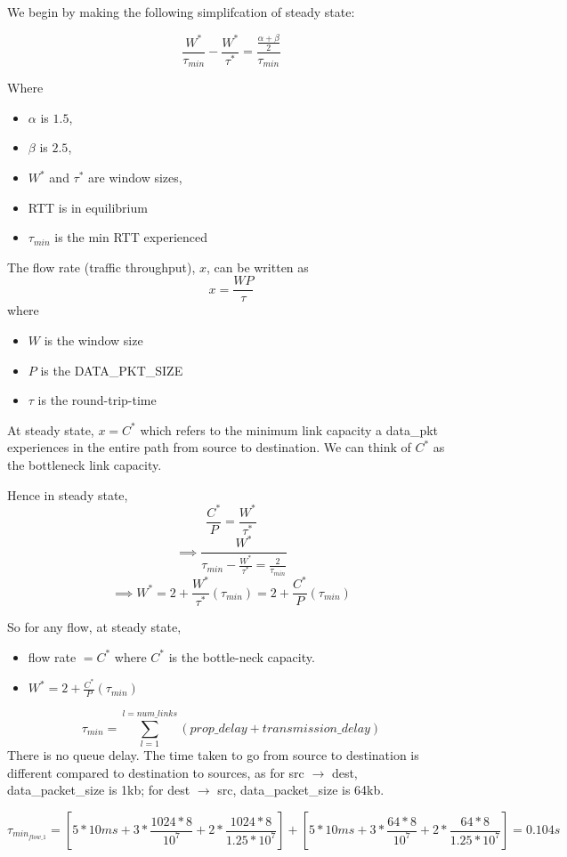 \documentclass[12pt]{article}
\begin{document}
We begin by making the following simplifcation of steady state:

$$ \frac{W^*}{\tau_{min}} - \frac{W^*}{\tau^*} = \frac{\frac{\alpha + \beta}{2}}{\tau_{min}} $$

Where 
\begin{itemize}
\item $\alpha$ is $1.5$,
\item $\beta$ is $2.5$,
\item $W^*$ and $\tau^*$ are window sizes,
\item RTT is in equilibrium
\item $\tau_{min}$ is the min RTT experienced
\end{itemize}

The flow rate (traffic throughput), $x$, can be written as $$x=\frac{WP}{\tau}$$ where
\begin{itemize}
\item $W$ is the window size
\item $P$ is the DATA\_PKT\_SIZE
\item $\tau$ is the round-trip-time
\end{itemize}

At steady state, $x=C^*$ which refers to the minimum link capacity a data\_pkt experiences in the entire path from source to destination. We can think of $C^*$ as the bottleneck link capacity.

Hence in steady state, $$\frac{C^*}{P} = \frac{W^*}{\tau^*} $$
$$\implies \frac{W^*}{\tau_{min} - \frac{W^*}{\tau^*} = \frac{2}{\tau_{min}}}$$
$$\implies W^* = 2 + \frac{W^*}{\tau^*}(\tau_{min}) = 2 + \frac{C^*}{P}(\tau_{min}) $$

So for any flow, at steady state, 
\begin{itemize}
\item flow rate $= C^*$ where $C^*$ is the bottle-neck capacity.
\item $W^*=2 + \frac{C^*}{P}(\tau_{min})$
\end{itemize}


$$\tau_{min}=\sum_{l=1}^{l=num\_links} (prop\_delay + transmission\_delay)$$
There is no queue delay. The time taken to go from source to destination is different compared to destination to sources, as for src $\rightarrow$ dest, data\_packet\_size is 1kb; for dest $\rightarrow$ src, data\_packet\_size is 64kb.


$$\tau_{min_{flow\_1}} = [5*10 ms + 3*\frac{1024*8}{10^7} + 2*\frac{1024*8}{1.25*10^7}] + [5*10 ms + 3*\frac{64*8}{10^7} + 2*\frac{64*8}{1.25*10^7}] = 0.104 s$$ 
\end{document}
